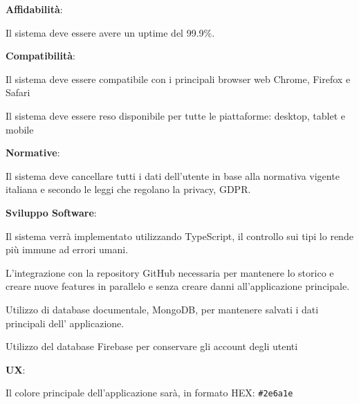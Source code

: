 \begin{rnfenum}
    \item \textbf{Affidabilità}:
        \begin{rnfenum}
            \item Il sistema deve essere avere un uptime del 99.9\%.
        \end{rnfenum}

    \item \textbf{Compatibilità}:
        \begin{rnfenum}
            \item Il sistema deve essere compatibile con i principali browser web Chrome, Firefox e Safari
            \item Il sistema deve essere reso disponibile per tutte le piattaforme: desktop, tablet e mobile
        \end{rnfenum}       

    \item \textbf{Normative}:
        \begin{rnfenum}
            \item Il sistema deve cancellare tutti i dati dell'utente in base alla normativa vigente italiana e secondo le leggi che regolano la privacy, GDPR.
        \end{rnfenum}

    \item \textbf{Sviluppo Software}:
        \begin{rnfenum}
            \item Il sistema verrà implementato utilizzando TypeScript, il controllo sui tipi lo rende più immune ad errori umani.
            \item L'integrazione con la repository GitHub necessaria per mantenere lo storico e creare nuove features in parallelo e senza creare danni all'applicazione principale.
            \item Utilizzo di database documentale, MongoDB, per mantenere salvati i dati principali dell' applicazione.
            \item Utilizzo del database Firebase per conservare gli account degli utenti
        \end{rnfenum}
        
    \item \textbf{UX}:
        \begin{rnfenum}
            \item Il colore principale dell'applicazione sarà, in formato HEX: \verb|#2e6a1e|
        \end{rnfenum}
    
    
\end{rnfenum}


